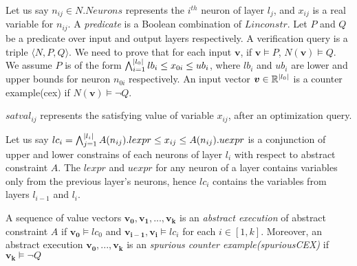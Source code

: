 Let us say $n_{ij} \in N.Neurons$ represents the $i^{th}$ neuron of layer $l_j$, and $x_{ij}$ is a real variable for $n_{ij}$. 
A {\em predicate} is a Boolean combination of $Linconstr$.
Let $P$ and $Q$ be a predicate over input and output layers respectively.
A verification query is a triple $\langle N, P, Q \rangle$.
We need to prove that for each input $\boldsymbol{v}$,
if $\boldsymbol{v} \models P$, $N(\boldsymbol{v}) \models Q$.
We assume $P$ is of the form
$\bigwedge_{i=1}^{|l_0|}lb_i \leq x_{0i} \leq ub_i$, where $lb_i$ and $ub_i$ are lower and upper bounds for neuron $n_{0i}$ respectively.
An input vector $\boldsymbol{v} \in \mathbb{R}^{|l_0|}$ is a counter example(cex) if $N(\boldsymbol{v}) \models \lnot Q$.  



$satval_{ij}$ represents the satisfying value of variable $x_{ij}$, after an optimization query.






Let us say $lc_i = \bigwedge_{j=1}^{|l_i|} A(n_{ij}).lexpr \leq x_{ij} \leq  A(n_{ij}).uexpr$ is a 
conjunction of upper and lower constrains of each neurons of layer $l_i$ with respect to abstract constraint $A$.
The $lexpr$ and $uexpr$ for any neuron of a layer contains variables only from the previous layer's neurons, 
hence $lc_i$ contains the variables from layers $l_{i-1}$ and $l_i$. 

\begin{df}
  A sequence of value vectors $\boldsymbol{v_0}, \boldsymbol{v_1}, ... , \boldsymbol{v_k}$ is an 
  {\em abstract execution} of abstract constraint $A$ if 
  $\boldsymbol{v_0} \models lc_0$ and $\boldsymbol{v_{i-1}}, \boldsymbol{v_i} \models lc_i$ for each $i \in [1,k]$.  
 Moreover, an abstract execution $\boldsymbol{v_0,...,v_k}$ is
  an {\em spurious counter example(spuriousCEX)} if $\boldsymbol{v_k} \models \lnot Q$
\end{df}

